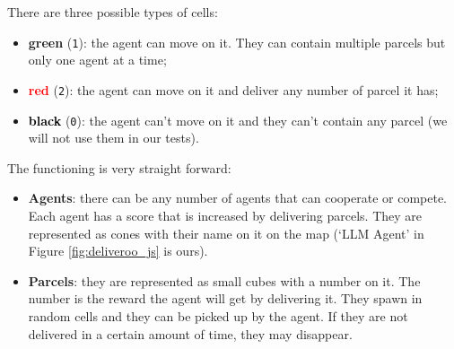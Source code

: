There are three possible types of cells:
\begin{itemize}
  \item \textcolor{primary}{\textbf{green}} (\texttt{1}): the agent can move on
    it. They can contain multiple parcels but only one agent at a time;

  \item \textcolor{red}{\textbf{red}} (\texttt{2}): the agent can move on it and
    deliver any number of parcel it has;

  \item \textcolor{black}{\textbf{black}} (\texttt{0}): the agent can't move on
    it and they can't contain any parcel (we will not use them in our tests).
\end{itemize}

The functioning is very straight forward:

\begin{itemize}
  \item \textbf{Agents}: there can be any number of agents that can cooperate or
    compete. Each agent has a score that is increased by delivering parcels. They
    are represented as cones with their name on it on the map (`LLM Agent' in
    Figure \ref{fig:deliveroo_js} is ours).

  \item \textbf{Parcels}: they are represented as small cubes with a number on it.
    The number is the reward the agent will get by delivering it. They spawn in random
    cells and they can be picked up by the agent. If they are not delivered in a
    certain amount of time, they may disappear.
\end{itemize}


